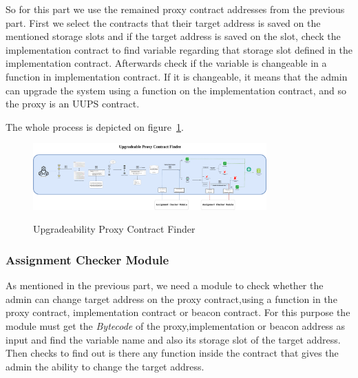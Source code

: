 So for this part we use the remained proxy contract addresses from the previous part. First we select the contracts that their target address is saved on the mentioned storage slots and if the target address is saved on the slot, check the implementation contract to find variable regarding that storage slot defined in the implementation contract. Afterwards check if the variable is changeable in a function in implementation contract. If it is changeable, it means that the admin can upgrade the system using a function on the implementation contract, and so the proxy is an UUPS contract. 

The whole process is depicted on figure~\ref{fig:finderModule}.

\begin{figure}[t]
  \includegraphics[width=0.8\textwidth]{figures/Upgradeability_finder1.png}\label{fig:finderModule}
  \caption{Upgradeability Proxy Contract Finder}
\end{figure}

\subsubsection{Assignment Checker Module}

As mentioned in the previous part, we need a module to check whether the admin can change target address on the proxy contract,using a function in the proxy contract, implementation contract or beacon contract. For this purpose the module must get the \textit{Bytecode} of the proxy,implementation or beacon address as input and find the variable name and also its storage slot of the target address. Then checks to find out is there any function inside the contract that gives the admin the ability to change the target address.

